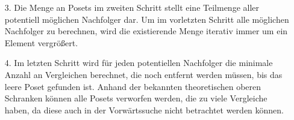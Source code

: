 \documentclass[10pt,journal,compsoc]{IEEEtran}
\begin{document}
\begin{itemize}
\begin{figure}
      \centering
      \caption{Problematischer Fall}
      \label{fig:backward_problematic}
    \end{figure}
    Durch entfernen des Vergleichs vom mittleren zum unteren Element in Poset (1) können sowohl Poset (2), als auch Poset (3) entstehen, wie in Abbildung~\ref{fig:backward_problematic} veranschaulicht. \\
    Um dieses Problem zu lösen, werden alle möglichen Nachfolger berechnet.

  \item[3.]
    Die Menge an Posets im zweiten Schritt stellt eine Teilmenge aller potentiell möglichen Nachfolger dar.
    Um im vorletzten Schritt alle möglichen Nachfolger zu berechnen, wird die existierende Menge iterativ immer um ein Element vergrößert.

  \item[4.]
    Im letzten Schritt wird für jeden potentiellen Nachfolger die minimale Anzahl an Vergleichen berechnet, die noch entfernt werden müssen, bis das leere Poset gefunden ist.
    Anhand der bekannten theoretischen oberen Schranken können alle Posets verworfen werden, die zu viele Vergleiche haben, da diese auch in der Vorwärtssuche nicht betrachtet werden können.
\end{itemize}
\end{document}
